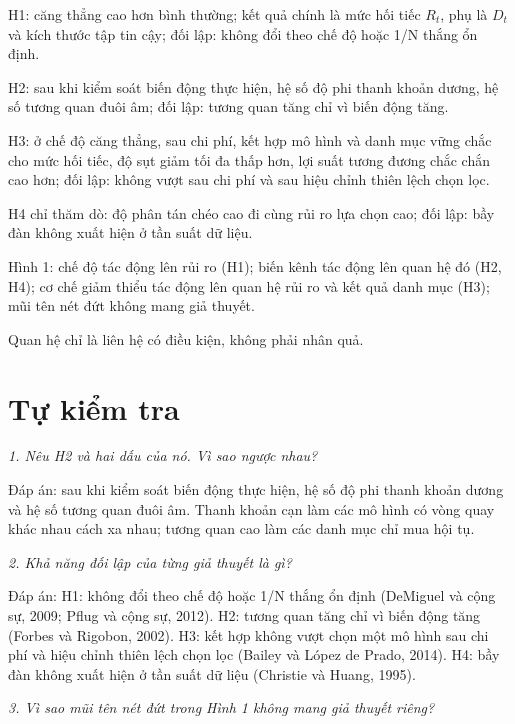 \begin{tcolorbox}[breakable]
H1: căng thẳng cao hơn bình thường; kết quả chính là mức hối tiếc \(R_{t}\), phụ là \(D_{t}\) và kích thước tập tin cậy; đối lập: không đổi theo chế độ hoặc 1/N thắng ổn định.

H2: sau khi kiểm soát biến động thực hiện, hệ số độ phi thanh khoản dương, hệ số tương quan đuôi âm; đối lập: tương quan tăng chỉ vì biến động tăng.

H3: ở chế độ căng thẳng, sau chi phí, kết hợp mô hình và danh mục vững chắc cho mức hối tiếc, độ sụt giảm tối đa thấp hơn, lợi suất tương đương chắc chắn cao hơn; đối lập: không vượt sau chi phí và sau hiệu chỉnh thiên lệch chọn lọc.

H4 chỉ thăm dò: độ phân tán chéo cao đi cùng rủi ro lựa chọn cao; đối lập: bầy đàn không xuất hiện ở tần suất dữ liệu.

Hình 1: chế độ tác động lên rủi ro (H1); biến kênh tác động lên quan hệ đó (H2, H4); cơ chế giảm thiểu tác động lên quan hệ rủi ro và kết quả danh mục (H3); mũi tên nét đứt không mang giả thuyết.

Quan hệ chỉ là liên hệ có điều kiện, không phải nhân quả.
\end{tcolorbox}

\section{Tự kiểm tra}

{\itshape 1. Nêu H2 và hai dấu của nó. Vì sao ngược nhau?\par}

Đáp án: sau khi kiểm soát biến động thực hiện, hệ số độ phi thanh khoản dương và hệ số tương quan đuôi âm. Thanh khoản cạn làm các mô hình có vòng quay khác nhau cách xa nhau; tương quan cao làm các danh mục chỉ mua hội tụ.

{\itshape 2. Khả năng đối lập của từng giả thuyết là gì?\par}

Đáp án: H1: không đổi theo chế độ hoặc 1/N thắng ổn định (DeMiguel và cộng sự, 2009; Pflug và cộng sự, 2012). H2: tương quan tăng chỉ vì biến động tăng (Forbes và Rigobon, 2002). H3: kết hợp không vượt chọn một mô hình sau chi phí và hiệu chỉnh thiên lệch chọn lọc (Bailey và López de Prado, 2014). H4: bầy đàn không xuất hiện ở tần suất dữ liệu (Christie và Huang, 1995).

{\itshape 3. Vì sao mũi tên nét đứt trong Hình 1 không mang giả thuyết riêng?\par}

